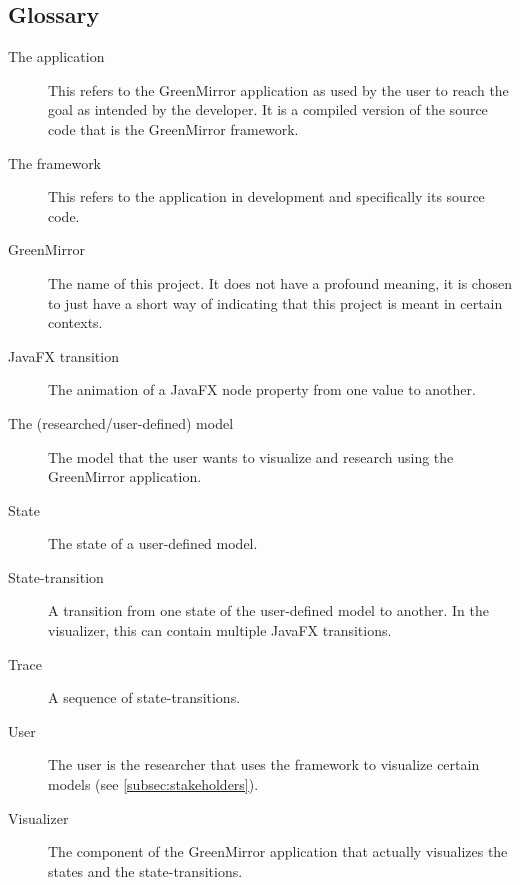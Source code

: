 \documentclass[a4paper]{article}
\begin{document}
	\subsection{Glossary}\label{subsec:glossary}
	\begin{description}
		\item[The application] This refers to the GreenMirror application as used by the user to reach the goal as intended by the developer. It is a compiled version of the source code that is the GreenMirror framework.
		\item[The framework] This refers to the application in development and specifically its source code.
		\item[GreenMirror] The name of this project. It does not have a profound meaning, it is chosen to just have a short way of indicating that this project is meant in certain contexts.
		\item[JavaFX transition] The animation of a JavaFX node property from one value to another.
		\item[The (researched/user-defined) model] The model that the user wants to visualize and research using the GreenMirror application.
		\item[State] The state of a user-defined model.
		\item[State-transition] A transition from one state of the user-defined model to another. In the visualizer, this can contain multiple JavaFX transitions.
		\item[Trace] A sequence of state-transitions.
		\item[User] The user is the researcher that uses the framework to visualize certain models (see \cref{subsec:stakeholders}).
		\item[Visualizer] The component of the GreenMirror application that actually visualizes the states and the state-transitions.
	\end{description}
	
\end{document}
